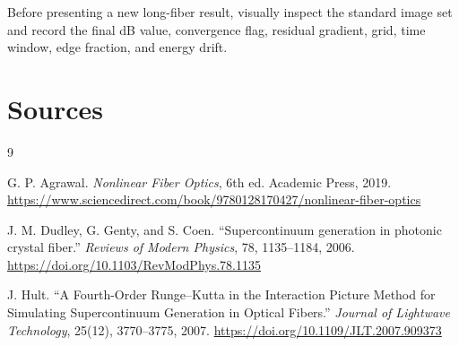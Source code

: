 \documentclass[11pt]{article}
\begin{document}
Before presenting a new long-fiber result, visually inspect the standard image
set and record the final dB value, convergence flag, residual gradient, grid,
time window, edge fraction, and energy drift.

\section{Sources}

\begin{thebibliography}{9}

G. P. Agrawal.
\textit{Nonlinear Fiber Optics}, 6th ed.
Academic Press, 2019.
\url{https://www.sciencedirect.com/book/9780128170427/nonlinear-fiber-optics}

J. M. Dudley, G. Genty, and S. Coen.
``Supercontinuum generation in photonic crystal fiber.''
\textit{Reviews of Modern Physics}, 78, 1135--1184, 2006.
\url{https://doi.org/10.1103/RevModPhys.78.1135}

J. Hult.
``A Fourth-Order Runge--Kutta in the Interaction Picture Method for
Simulating Supercontinuum Generation in Optical Fibers.''
\textit{Journal of Lightwave Technology}, 25(12), 3770--3775, 2007.
\url{https://doi.org/10.1109/JLT.2007.909373}

\end{thebibliography}
\end{document}
